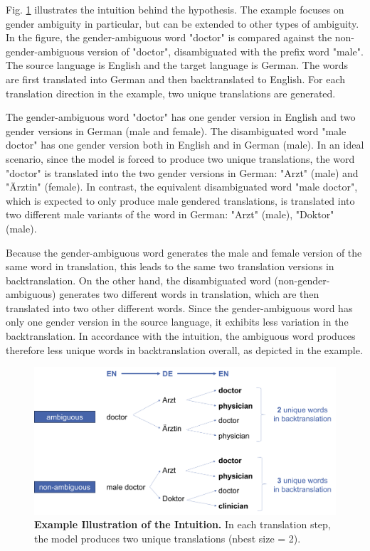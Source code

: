 Fig. \ref{fig:intuition} illustrates the intuition behind the hypothesis. The example focuses on gender ambiguity in particular, but can be extended to other types of ambiguity. In the figure, the gender-ambiguous word "doctor" is compared against the non-gender-ambiguous version of "doctor", disambiguated with the prefix word "male". The source language is English and the target language is German. The words are first translated into German and then backtranslated to English. For each translation direction in the example, two unique translations are generated. 

The gender-ambiguous word "doctor" has one gender version in English and two gender versions in German (male and female). The disambiguated word "male doctor" has one gender version both in English and in German (male). In an ideal scenario, since the model is forced to produce two unique translations, the word "doctor" is translated into the two gender versions in German: "Arzt" (male) and "Ärztin" (female). In contrast, the equivalent disambiguated word "male doctor", which is expected to only produce male gendered translations, is translated into two different male variants of the word in German: "Arzt" (male), "Doktor" (male). 

Because the gender-ambiguous word generates the male and female version of the same word in translation, this leads to the same two translation versions in backtranslation. On the other hand, the disambiguated word (non-gender-ambiguous) generates two different words in translation, which are then translated into two other different words. Since the gender-ambiguous word has only one gender version in the source language, it exhibits less variation in the backtranslation. In accordance with the intuition, the ambiguous word produces therefore less unique words in backtranslation overall, as depicted in the example.


\begin{figure}[!htb]
  \centering
  \includegraphics[scale=0.45]{figures/intuition.png}
  \caption[Example Illustration of the Intuition]{\textbf{Example Illustration of the Intuition.} In each translation step, the model produces two unique translations (nbest size = 2).}
  \label{fig:intuition}
\end{figure}


